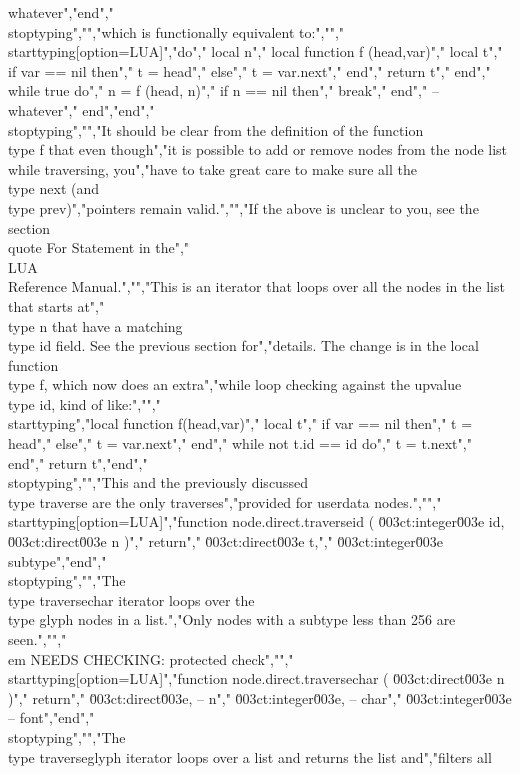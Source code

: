 whatever","end","\\stoptyping","","which is functionally equivalent to:","","\\starttyping[option=LUA]","do","    local n","    local function f (head,var)","        local t","        if var == nil then","            t = head","        else","            t = var.next","        end","        return t","    end","    while true do","        n = f (head, n)","        if n == nil then","            break","        end","        -- whatever","    end","end","\\stoptyping","","It should be clear from the definition of the function \\type {f} that even though","it is possible to add or remove nodes from the node list while traversing, you","have to take great care to make sure all the \\type {next} (and \\type {prev})","pointers remain valid.","","If the above is unclear to you, see the section \\quote {For Statement} in the","\\LUA\\ Reference Manual.","","This is an iterator that loops over all the nodes in the list that starts at","\\type {n} that have a matching \\type {id} field. See the previous section for","details. The change is in the local function \\type {f}, which now does an extra","while loop checking against the upvalue \\type {id}, kind of like:","","\\starttyping","local function f(head,var)","    local t","    if var == nil then","        t = head","    else","        t = var.next","    end","    while not t.id == id do","        t = t.next","    end","    return t","end","\\stoptyping","","This and the previously discussed \\type {traverse} are the only traverses","provided for userdata nodes.","","\\starttyping[option=LUA]","function node.direct.traverseid ( \u003ct:integer\u003e id, \u003ct:direct\u003e n )","    return","        \u003ct:direct\u003e  t,","        \u003ct:integer\u003e subtype","end","\\stoptyping","","The \\type {traversechar} iterator loops over the \\type {glyph} nodes in a list.","Only nodes with a subtype less than 256 are seen.","","{\\em NEEDS CHECKING: protected check}","","\\starttyping[option=LUA]","function node.direct.traversechar ( \u003ct:direct\u003e n )","    return","        \u003ct:direct\u003e,  -- n","        \u003ct:integer\u003e, -- char","        \u003ct:integer\u003e  -- font","end","\\stoptyping","","The \\type {traverseglyph} iterator loops over a list and returns the list and","filters all 